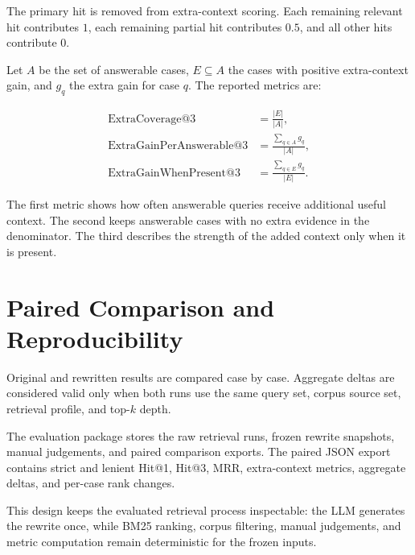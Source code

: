 The primary hit is removed from extra-context scoring. Each remaining relevant hit contributes $1$, each remaining partial hit contributes $0.5$, and all other hits contribute $0$.

Let $A$ be the set of answerable cases, $E \subseteq A$ the cases with positive extra-context gain, and $g_q$ the extra gain for case $q$. The reported metrics are:

\begin{align}
\operatorname{ExtraCoverage@3} &= \frac{|E|}{|A|},\\
\operatorname{ExtraGainPerAnswerable@3} &= \frac{\sum_{q\in A}g_q}{|A|},\\
\operatorname{ExtraGainWhenPresent@3} &= \frac{\sum_{q\in E}g_q}{|E|}.
\end{align}

The first metric shows how often answerable queries receive additional useful context. The second keeps answerable cases with no extra evidence in the denominator. The third describes the strength of the added context only when it is present.

\section{Paired Comparison and Reproducibility}
Original and rewritten results are compared case by case. Aggregate deltas are considered valid only when both runs use the same query set, corpus source set, retrieval profile, and top-$k$ depth.

The evaluation package stores the raw retrieval runs, frozen rewrite snapshots, manual judgements, and paired comparison exports. The paired JSON export contains strict and lenient Hit@1, Hit@3, MRR, extra-context metrics, aggregate deltas, and per-case rank changes.

This design keeps the evaluated retrieval process inspectable: the LLM generates the rewrite once, while BM25 ranking, corpus filtering, manual judgements, and metric computation remain deterministic for the frozen inputs.
\par
